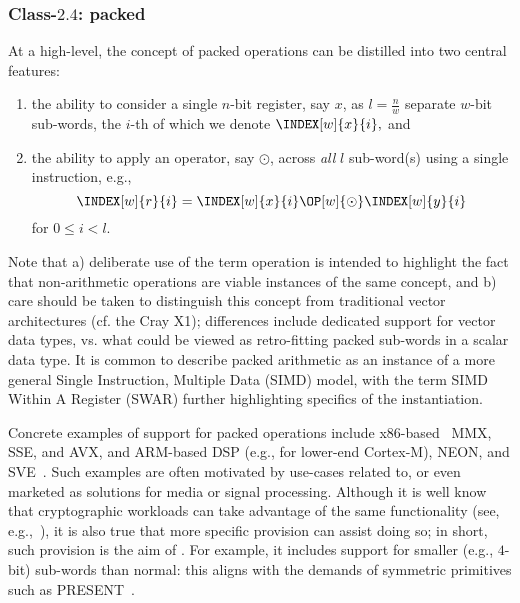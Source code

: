 
\subsubsection{Class-$2.4$: packed}
\label{sec:bg:feature:2:4}

At a high-level, the concept of packed operations can be distilled into two 
central features:

\begin{enumerate}
\item the ability to consider a single $n$-bit register, 
      say $x$, 
      as $l = \frac{n}{w}$ separate $w$-bit sub-words, the $i$-th of which
      we denote
      $
      \INDEX[w]{x}{i} ,
      $
      and
\item the ability to apply an operator,
      say $\odot$,
      across {\em all} $l$ sub-word(s) using a single instruction, e.g.,
      \[
      \INDEX[w]{r}{i} = \INDEX[w]{x}{i} \OP[w]{\odot} \INDEX[w]{y}{i}
      \]
      for $0 \leq i < l$.
\end{enumerate}

\noindent
Note that
a) deliberate use of the term operation is intended to highlight the fact 
   that non-arithmetic operations are viable instances of the same concept,
   and
b) care should be taken to distinguish this concept from traditional vector 
   architectures
   (cf. the Cray X1);
   differences include dedicated support for vector data types, vs. what
   could be viewed as retro-fitting packed sub-words in a scalar data type.
It is common to describe packed arithmetic as an instance of a more general
Single Instruction, Multiple Data (SIMD) model, with the term SIMD Within 
A Register (SWAR) further highlighting specifics of the instantiation.

Concrete examples of support for packed operations include
x86-based~\cite[Section 2.2.7]{SCARV:X86:2:18} MMX, SSE, and AVX,
and
ARM-based DSP (e.g., for lower-end Cortex-M), NEON, and SVE~\cite{SCARV:SBBEEGHMMPRRW:17}.
Such examples are often motivated by use-cases related to, or even marketed 
as solutions for media or signal processing.  Although it is well know that
cryptographic workloads can take advantage of the same functionality
(see, e.g.,~\cite{SCARV:Hamburg:09,SCARV:BerSch:12}),
it is also true that more specific provision can assist doing so; in short,
such provision is the aim of \XCID.  For example, it includes support for
smaller (e.g., $4$-bit) sub-words than normal: this aligns with the demands
of symmetric primitives such as PRESENT~\cite{SCARV:BKLPPRSV:07}.

